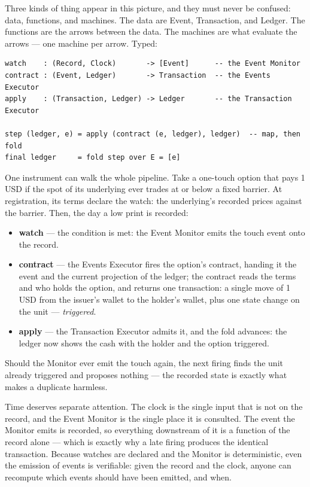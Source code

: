 \documentclass[11pt,a4paper]{article}
\providecommand{\tightlist}{\setlength{\itemsep}{2pt}\setlength{\parskip}{0pt}}
\begin{document}
Three kinds of thing appear in this picture, and they must never be
confused: data, functions, and machines. The data are Event,
Transaction, and Ledger. The functions are the arrows between the data.
The machines are what evaluate the arrows --- one machine per arrow.
Typed:

\begin{verbatim}
watch    : (Record, Clock)       -> [Event]      -- the Event Monitor
contract : (Event, Ledger)       -> Transaction  -- the Events Executor
apply    : (Transaction, Ledger) -> Ledger       -- the Transaction Executor

step (ledger, e) = apply (contract (e, ledger), ledger)  -- map, then fold
final ledger     = fold step over E = [e]
\end{verbatim}

One instrument can walk the whole pipeline. Take a one-touch option that
pays 1 USD if the spot of its underlying ever trades at or below a fixed
barrier. At registration, its terms declare the watch: the underlying's
recorded prices against the barrier. Then, the day a low print is
recorded:

\begin{itemize}
\tightlist
\item
  \textbf{watch} --- the condition is met: the Event Monitor emits the
  touch event onto the record.
\item
  \textbf{contract} --- the Events Executor fires the option's contract,
  handing it the event and the current projection of the ledger; the
  contract reads the terms and who holds the option, and returns one
  transaction: a single move of 1 USD from the issuer's wallet to the
  holder's wallet, plus one state change on the unit ---
  \emph{triggered}.
\item
  \textbf{apply} --- the Transaction Executor admits it, and the fold
  advances: the ledger now shows the cash with the holder and the option
  triggered.
\end{itemize}

Should the Monitor ever emit the touch again, the next firing finds the
unit already triggered and proposes nothing --- the recorded state is
exactly what makes a duplicate harmless.

Time deserves separate attention. The clock is the single input that is
not on the record, and the Event Monitor is the single place it is
consulted. The event the Monitor emits is recorded, so everything
downstream of it is a function of the record alone --- which is exactly
why a late firing produces the identical transaction. Because watches
are declared and the Monitor is deterministic, even the emission of
events is verifiable: given the record and the clock, anyone can
recompute which events should have been emitted, and when.
\end{document}

